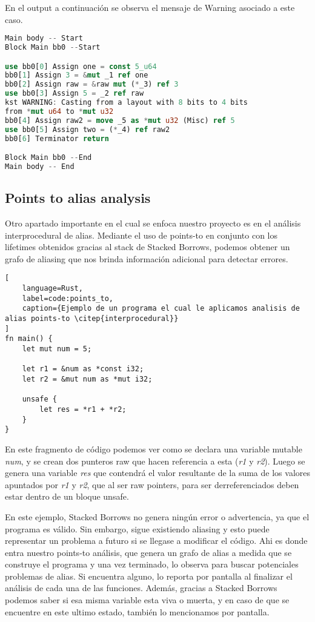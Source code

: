 En el output a continuación se observa el mensaje de Warning asociado a este caso.

\begin{lstlisting}[language=rust]
Main body -- Start
Block Main bb0 --Start

use bb0[0] Assign one = const 5_u64
bb0[1] Assign 3 = &mut _1 ref one
bb0[2] Assign raw = &raw mut (*_3) ref 3
use bb0[3] Assign 5 = _2 ref raw
kst WARNING: Casting from a layout with 8 bits to 4 bits
from *mut u64 to *mut u32
bb0[4] Assign raw2 = move _5 as *mut u32 (Misc) ref 5
use bb0[5] Assign two = (*_4) ref raw2
bb0[6] Terminator return

Block Main bb0 --End
Main body -- End
\end{lstlisting}

\subsection{Points to alias analysis}
Otro apartado importante en el cual se enfoca nuestro proyecto es en el análisis interprocedural de alias. Mediante el uso de points-to en conjunto con los lifetimes obtenidos gracias al stack de Stacked Borrows, podemos obtener un grafo de aliasing que nos brinda información adicional para detectar errores.

\begin{lstlisting}[
    language=Rust,
    label=code:points_to,
    caption={Ejemplo de un programa el cual le aplicamos analisis de alias points-to \citep{interprocedural}}
]
fn main() {
    let mut num = 5;

    let r1 = &num as *const i32;
    let r2 = &mut num as *mut i32;

    unsafe {
        let res = *r1 + *r2;
    }
}
\end{lstlisting}

En este fragmento de código podemos ver como se declara una variable mutable \textit{num}, y se crean dos punteros raw que hacen referencia a esta (\textit{r1} y \textit{r2}). Luego se genera una variable \textit{res} que contendrá el valor resultante de la suma de los valores apuntados por \textit{r1} y \textit{r2}, que al ser raw pointers, para ser derreferenciados deben estar dentro de un bloque unsafe.

En este ejemplo, Stacked Borrows no genera ningún error o advertencia, ya que el programa es válido. Sin embargo, sigue existiendo aliasing y esto puede representar un problema a futuro si se llegase a modificar el código. Ahi es donde entra nuestro points-to análisis, que genera un grafo de alias a medida que se construye el programa y una vez terminado, lo observa para buscar potenciales problemas de alias. Si encuentra alguno, lo reporta por pantalla al finalizar el análisis de cada una de las funciones. Además, gracias a Stacked Borrows podemos saber si esa misma variable esta viva o muerta, y en caso de que se encuentre en este ultimo estado, también lo mencionamos por pantalla.

